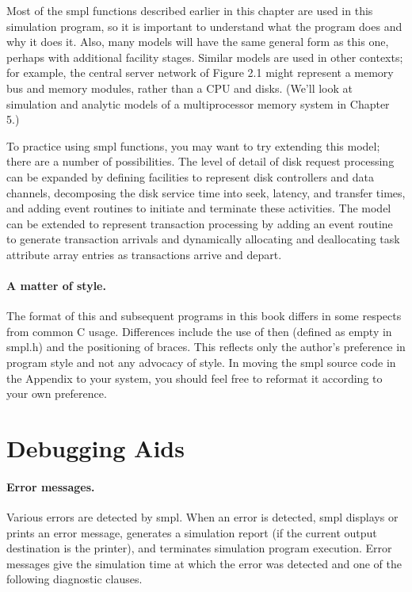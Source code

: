Most of the smpl functions described earlier in this chapter are used in this
simulation program, so it is important to understand what the program does
and why it does it. Also, many models will have the same general form as this
one, perhaps with additional facility stages. Similar models are used in other
contexts; for example, the central server network of Figure 2.1 might
represent a memory bus and memory modules, rather than a CPU and disks.
(We'll look at simulation and analytic models of a multiprocessor memory
system in Chapter 5.)

To practice using smpl functions, you may want to try extending this model;
there are a number of possibilities. The level of detail of disk request
processing can be expanded by defining facilities to represent disk
controllers and data channels, decomposing the disk service time into seek,
\noindent latency, and transfer times, and adding event routines to initiate and
terminate these activities. The model can be extended to represent
transaction processing by adding an event routine to generate transaction
arrivals and dynamically allocating and deallocating task attribute array
entries as transactions arrive and depart.

\paragraph{A matter of style.}
The format of this and subsequent programs in this book differs in some
respects from common C usage. Differences include the use of then (defined as
empty in smpl.h) and the positioning of braces. This reflects only the
author's preference in program style and not any advocacy of style. In moving
the smpl source code in the Appendix to your system, you should feel free to
reformat it according to your own preference.

\section{Debugging Aids}
\label{sec:smpl-debugging-aids}

\paragraph{Error messages.}
Various errors are detected by smpl. When an error is detected, smpl displays
or prints an error message, generates a simulation report (if the current
output destination is the printer), and terminates simulation program
execution. Error messages give the simulation time at which the error was
detected and one of the following diagnostic clauses.

